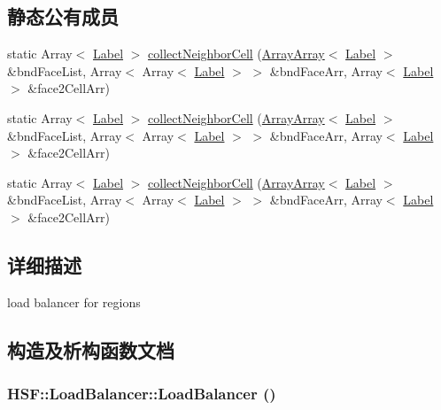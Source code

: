 \subsection*{静态公有成员}
\begin{DoxyCompactItemize}
\item 
static Array$<$ \hyperlink{namespaceHSF_ae65d72be782e989396ebe5ec6ae4c2b6}{Label} $>$ \hyperlink{classHSF_1_1LoadBalancer_af816897dbfedc38b2d56b756f9f31a09}{collectNeighborCell} (\hyperlink{classHSF_1_1ArrayArray}{ArrayArray}$<$ \hyperlink{namespaceHSF_ae65d72be782e989396ebe5ec6ae4c2b6}{Label} $>$ \&bndFaceList, Array$<$ Array$<$ \hyperlink{namespaceHSF_ae65d72be782e989396ebe5ec6ae4c2b6}{Label} $>$ $>$ \&bndFaceArr, Array$<$ \hyperlink{namespaceHSF_ae65d72be782e989396ebe5ec6ae4c2b6}{Label} $>$ \&face2CellArr)
\item 
static Array$<$ \hyperlink{namespaceHSF_ae65d72be782e989396ebe5ec6ae4c2b6}{Label} $>$ \hyperlink{classHSF_1_1LoadBalancer_a459b7a6b19fccba53c7c6bd5d6ff60a2}{collectNeighborCell} (\hyperlink{classHSF_1_1ArrayArray}{ArrayArray}$<$ \hyperlink{namespaceHSF_ae65d72be782e989396ebe5ec6ae4c2b6}{Label} $>$ \&bndFaceList, Array$<$ Array$<$ \hyperlink{namespaceHSF_ae65d72be782e989396ebe5ec6ae4c2b6}{Label} $>$ $>$ \&bndFaceArr, Array$<$ \hyperlink{namespaceHSF_ae65d72be782e989396ebe5ec6ae4c2b6}{Label} $>$ \&face2CellArr)
\item 
static Array$<$ \hyperlink{namespaceHSF_ae65d72be782e989396ebe5ec6ae4c2b6}{Label} $>$ \hyperlink{classHSF_1_1LoadBalancer_a459b7a6b19fccba53c7c6bd5d6ff60a2}{collectNeighborCell} (\hyperlink{classHSF_1_1ArrayArray}{ArrayArray}$<$ \hyperlink{namespaceHSF_ae65d72be782e989396ebe5ec6ae4c2b6}{Label} $>$ \&bndFaceList, Array$<$ Array$<$ \hyperlink{namespaceHSF_ae65d72be782e989396ebe5ec6ae4c2b6}{Label} $>$ $>$ \&bndFaceArr, Array$<$ \hyperlink{namespaceHSF_ae65d72be782e989396ebe5ec6ae4c2b6}{Label} $>$ \&face2CellArr)
\end{DoxyCompactItemize}


\subsection{详细描述}
load balancer for regions 

\subsection{构造及析构函数文档}
\hypertarget{classHSF_1_1LoadBalancer_af9fd71150f3cd1b8c4f87023b916dedc}{
\subsubsection[{LoadBalancer}]{\setlength{\rightskip}{0pt plus 5cm}HSF::LoadBalancer::LoadBalancer ()}}
\label{classHSF_1_1LoadBalancer_af9fd71150f3cd1b8c4f87023b916dedc}


